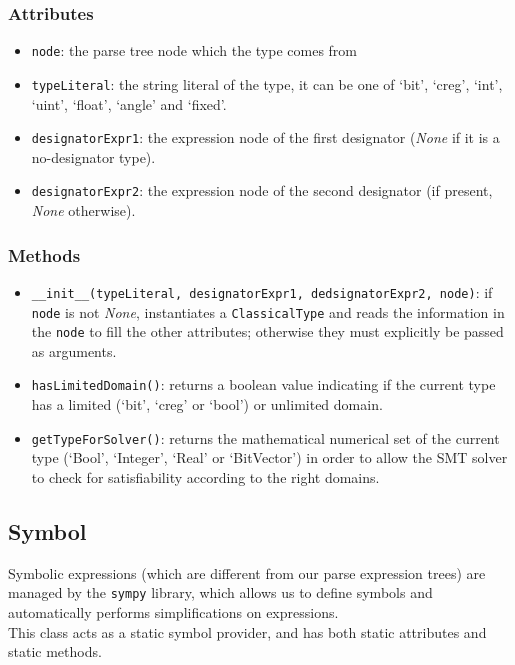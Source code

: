 \documentclass[12pt,a4paper]{report}
\theoremstyle{definition}
\theoremstyle{definition}
\theoremstyle{definition}
\begin{document}
\subsubsection{Attributes}
\begin{itemize}
    \itemsep 0em
    \item \texttt{node}: the parse tree node which the type comes from
    \item \texttt{typeLiteral}: the string literal of the type, it can be one of `bit', `creg', `int', `uint', `float', `angle' and `fixed'.
    \item \texttt{designatorExpr1}: the expression node of the first designator (\textit{None} if it is a no-designator type).
    \item \texttt{designatorExpr2}: the expression node of the second designator (if present, \textit{None} otherwise).
\end{itemize}
\subsubsection{Methods}
\begin{itemize}
    \itemsep 0em
    \item \texttt{\_\_init\_\_(typeLiteral, designatorExpr1, dedsignatorExpr2, node)}: if \texttt{node} is not \textit{None}, instantiates a \texttt{ClassicalType} and reads the information in the \texttt{node} to fill the other attributes; otherwise they must explicitly be passed as arguments.
    \item \texttt{hasLimitedDomain()}: returns a boolean value indicating if the current type has a limited (`bit', `creg' or `bool') or unlimited domain.
    \item \texttt{getTypeForSolver()}: returns the mathematical numerical set of the current type (`Bool', `Integer', `Real' or `BitVector') in order to allow the SMT solver to check for satisfiability according to the right domains.
\end{itemize}

\subsection{Symbol}
Symbolic expressions (which are different from our parse expression trees) are managed by the \texttt{sympy} library, which allows us to define symbols and automatically performs simplifications on expressions.\\
This class acts as a static symbol provider, and has both static attributes and static methods.
\end{document}

